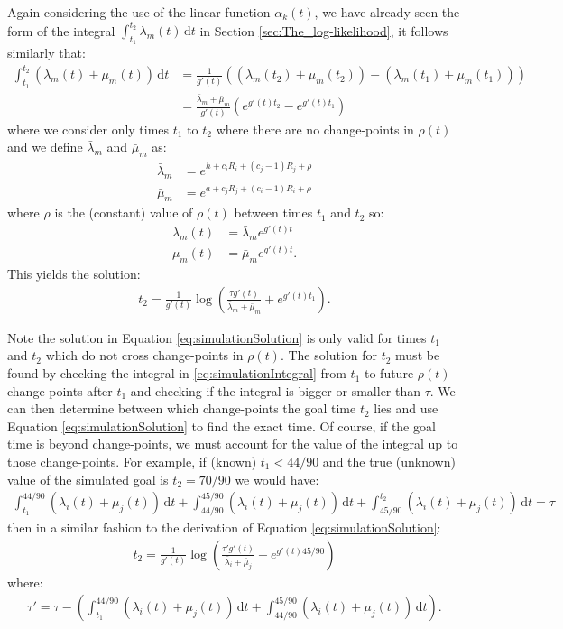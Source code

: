 Again considering the use of the linear function \(\alpha_k(t)\), we have already seen the form of the integral
\(\int_{t_1}^{t_2} \lambda_m(t) \, \mathrm{d}t\) in Section \ref{sec:The_log-likelihood}, it follows similarly that:
\begin{align} 
\int_{t_1}^{t_2} (\lambda_m(t) + \mu_m(t)) \, \mathrm{d}t 
&= \frac{1}{g'(t)} ((\lambda_m(t_2) + \mu_m(t_2)) - (\lambda_m(t_1) + \mu_m(t_1))) \\
&= \frac{\bar{\lambda}_m + \bar{\mu}_m}{g'(t)} (e^{g'(t) t_2} - e^{g'(t) t_1})
\end{align}
where we consider only times \(t_1\) to \(t_2\) where there are no change-points in \(\rho(t)\) and we define
\(\bar{\lambda}_m\) and \(\bar{\mu}_m\) as:
\begin{align} 
\bar{\lambda}_m &= e^{h + c_i R_i + (c_j - 1) R_j + \rho} \\
\bar{\mu}_m &= e^{a + c_j R_j + (c_i - 1) R_i + \rho}
\end{align}
where \(\rho\) is the (constant) value of \(\rho(t)\) between times \(t_1\) and \(t_2\) so:
\begin{align} 
\lambda_m(t) &= \bar{\lambda}_m e^{g'(t) t} \\
\mu_m(t) &= \bar{\mu}_m e^{g'(t) t}.
\end{align}
This yields the solution:
\begin{align} 
\label{eq:simulationSolution} 
t_2 = \frac{1}{g'(t)} \log\left(\frac{\tau g'(t)}{\bar{\lambda}_m + \bar{\mu}_m} + e^{g'(t) t_1}\right).
\end{align}

Note the solution in Equation \eqref{eq:simulationSolution} is only valid for times \(t_1\) and \(t_2\) which do not
cross change-points in \(\rho(t)\). The solution for \(t_2\) must be found by checking the integral in
\eqref{eq:simulationIntegral} from \(t_1\) to future \(\rho(t)\) change-points after \(t_1\) and checking if the
integral is bigger or smaller than \(\tau\). We can then determine between which change-points the goal time \(t_2\)
lies and use Equation \eqref{eq:simulationSolution} to find the exact time. Of course, if the goal time is beyond
change-points, we must account for the value of the integral up to those change-points. For example, if (known) \(t_1 <
44/90\) and the true (unknown) value of the simulated goal is \(t_2 = 70 / 90\) we would have:
\begin{align}
\int_{t_1}^{44/90} (\lambda_{i}(t) + \mu_{j}(t)) \, \mathrm{d}t + 
\int_{44/90}^{45/90} (\lambda_{i}(t) + \mu_{j}(t)) \, \mathrm{d}t +
\int_{45/90}^{t_2} (\lambda_{i}(t) + \mu_{j}(t)) \, \mathrm{d}t
= \tau
\end{align}
then in a similar fashion to the derivation of Equation \eqref{eq:simulationSolution}:
\begin{align} 
t_2 = \frac{1}{g'(t)} \log\left(\frac{\tau' g'(t)}{\bar{\lambda}_i + \bar{\mu}_j} + e^{g'(t) 45/90}\right)
\end{align}
where:
\begin{align} 
\tau' = \tau - \left(
\int_{t_1}^{44/90} (\lambda_{i}(t) + \mu_{j}(t)) \, \mathrm{d}t + 
\int_{44/90}^{45/90} (\lambda_{i}(t) + \mu_{j}(t)) \, \mathrm{d}t
\right).
\end{align}

